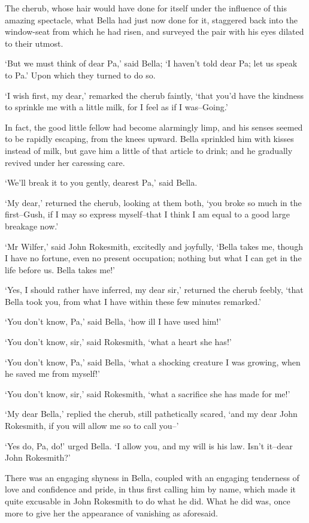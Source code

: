 The cherub, whose hair would have done for itself under the influence of
this amazing spectacle, what Bella had just now done for it, staggered
back into the window-seat from which he had risen, and surveyed the pair
with his eyes dilated to their utmost.

‘But we must think of dear Pa,’ said Bella; ‘I haven’t told dear Pa; let
us speak to Pa.’ Upon which they turned to do so.

‘I wish first, my dear,’ remarked the cherub faintly, ‘that you’d have
the kindness to sprinkle me with a little milk, for I feel as if I
was--Going.’

In fact, the good little fellow had become alarmingly limp, and his
senses seemed to be rapidly escaping, from the knees upward. Bella
sprinkled him with kisses instead of milk, but gave him a little of that
article to drink; and he gradually revived under her caressing care.

‘We’ll break it to you gently, dearest Pa,’ said Bella.

‘My dear,’ returned the cherub, looking at them both, ‘you broke so much
in the first--Gush, if I may so express myself--that I think I am equal
to a good large breakage now.’

‘Mr Wilfer,’ said John Rokesmith, excitedly and joyfully, ‘Bella takes
me, though I have no fortune, even no present occupation; nothing but
what I can get in the life before us. Bella takes me!’

‘Yes, I should rather have inferred, my dear sir,’ returned the cherub
feebly, ‘that Bella took you, from what I have within these few minutes
remarked.’

‘You don’t know, Pa,’ said Bella, ‘how ill I have used him!’

‘You don’t know, sir,’ said Rokesmith, ‘what a heart she has!’

‘You don’t know, Pa,’ said Bella, ‘what a shocking creature I was
growing, when he saved me from myself!’

‘You don’t know, sir,’ said Rokesmith, ‘what a sacrifice she has made
for me!’

‘My dear Bella,’ replied the cherub, still pathetically scared, ‘and my
dear John Rokesmith, if you will allow me so to call you--’

‘Yes do, Pa, do!’ urged Bella. ‘I allow you, and my will is his law.
Isn’t it--dear John Rokesmith?’

There was an engaging shyness in Bella, coupled with an engaging
tenderness of love and confidence and pride, in thus first calling him
by name, which made it quite excusable in John Rokesmith to do what he
did. What he did was, once more to give her the appearance of vanishing
as aforesaid.

